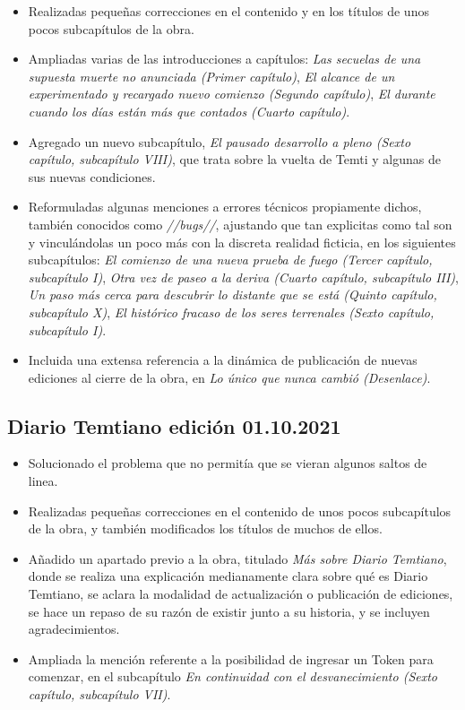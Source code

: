 \documentclass[
  spanish,
]{book}
\begin{document}
\begin{itemize}
\item
  Realizadas pequeñas correcciones en el contenido y en los títulos de unos pocos subcapítulos de la obra.
\item
  Ampliadas varias de las introducciones a capítulos: \emph{Las secuelas de una supuesta muerte no anunciada (Primer capítulo)}, \emph{El alcance de un experimentado y recargado nuevo comienzo (Segundo capítulo)}, \emph{El durante cuando los días están más que contados (Cuarto capítulo)}.
\item
  Agregado un nuevo subcapítulo, \emph{El pausado desarrollo a pleno (Sexto capítulo, subcapítulo VIII)}, que trata sobre la vuelta de Temti y algunas de sus nuevas condiciones.
\item
  Reformuladas algunas menciones a errores técnicos propiamente dichos, también conocidos como \emph{//bugs//}, ajustando que tan explicitas como tal son y vinculándolas un poco más con la discreta realidad ficticia, en los siguientes subcapítulos: \emph{El comienzo de una nueva prueba de fuego (Tercer capítulo, subcapítulo I)}, \emph{Otra vez de paseo a la deriva (Cuarto capítulo, subcapítulo III)}, \emph{Un paso más cerca para descubrir lo distante que se está (Quinto capítulo, subcapítulo X)}, \emph{El histórico fracaso de los seres terrenales (Sexto capítulo, subcapítulo I)}.
\item
  Incluida una extensa referencia a la dinámica de publicación de nuevas ediciones al cierre de la obra, en \emph{Lo único que nunca cambió (Desenlace)}.
\end{itemize}

\hypertarget{diario-temtiano-ediciuxf3n-01.10.2021}{%
\subsection*{Diario Temtiano edición 01.10.2021}\label{diario-temtiano-ediciuxf3n-01.10.2021}}

\begin{itemize}
\item
  Solucionado el problema que no permitía que se vieran algunos saltos de linea.
\item
  Realizadas pequeñas correcciones en el contenido de unos pocos subcapítulos de la obra, y también modificados los títulos de muchos de ellos.
\item
  Añadido un apartado previo a la obra, titulado \emph{Más sobre Diario Temtiano}, donde se realiza una explicación medianamente clara sobre qué es Diario Temtiano, se aclara la modalidad de actualización o publicación de ediciones, se hace un repaso de su razón de existir junto a su historia, y se incluyen agradecimientos.
\item
  Ampliada la mención referente a la posibilidad de ingresar un Token para comenzar, en el subcapítulo \emph{En continuidad con el desvanecimiento (Sexto capítulo, subcapítulo VII)}.
\end{itemize}
\end{document}
